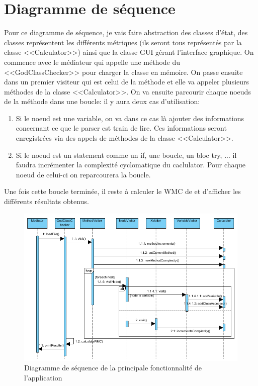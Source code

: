 \documentclass[a4paper, 11pt]{article}
\begin{document}
\section{Diagramme de séquence}

	Pour ce diagramme de séquence, je vais faire abstraction des classes d'état, des classes représentent les différents métriques (ils seront tous représentés par la classe <<Calculator>>) ainsi que la classe GUI gérant l'interface graphique. On commence avec le médiateur qui appelle une méthode du <<GodClassChecker>> pour charger la classe en mémoire. On passe ensuite dans un premier visiteur qui est celui de la méthode et elle va appeler plusieurs méthodes de la classe <<Calculator>>. On va ensuite parcourir chaque noeuds de la méthode dans une boucle: il y aura deux cas d'utilisation:
	\begin{enumerate}
		\item Si le noeud est une variable, on va dans ce cas là ajouter des informations concernant ce que le parser est train de lire. Ces informations seront enregistrées via des appels de méthodes de la classe <<Calculator>>.
		\item Si le noeud est un statement comme un if, une boucle, un bloc try, ... il faudra incrémenter la complexité cyclomatique du caclulator. Pour chaque noeud de celui-ci on reparcourera la boucle.
	\end{enumerate}
	
	Une fois cette boucle terminée, il reste à calculer le WMC de et d'afficher les différents résultats obtenus.

	\begin{figure}[!h]
		\centering
		\includegraphics[scale=0.8]{Images/seq.png}
		\caption{Diagramme de séquence de la principale fonctionnalité de l'application}
	\end{figure}
\end{document}
